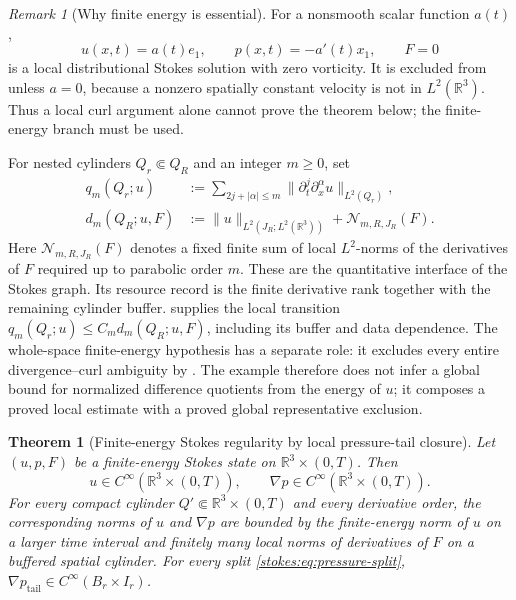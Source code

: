 \documentclass[11pt,reqno]{amsart}
\theoremstyle{plain}
\newtheorem{theorem}{Theorem}[section]
\theoremstyle{definition}
\theoremstyle{remark}
\newtheorem{remark}[remark]{Remark}
\numberwithin{equation}{section}
\newcommand{\R}{\mathbb R}
\begin{document}
\begin{remark}[Why finite energy is essential]\label{stokes:rem:counterexample}
For a nonsmooth scalar function \(a(t)\),
\[
 u(x,t)=a(t)e_1,\qquad p(x,t)=-a'(t)x_1,\qquad F=0
\]
is a local distributional Stokes solution with zero vorticity.  It is excluded
from  unless \(a=0\), because a nonzero spatially
constant velocity is not in \(L^2(\R^3)\).  Thus a local curl argument alone
cannot prove the theorem below; the finite-energy branch must be used.
\end{remark}

For nested cylinders \(Q_r\Subset Q_R\) and an integer \(m\ge0\), set
\begin{align}
 q_m(Q_r;u)
 &:=\sum_{2j+|\alpha|\le m}
 \|\partial_t^j\partial_x^\alpha u\|_{L^2(Q_r)},
 \label{stokes:eq:q-interface}\\
 d_m(Q_R;u,F)
 &:=\|u\|_{L^2(J_R;L^2(\R^3))}
   +\mathcal N_{m,R,J_R}(F).
 \label{stokes:eq:d-interface}
\end{align}
Here \(\mathcal N_{m,R,J_R}(F)\) denotes a fixed finite sum of local
\(L^2\)-norms of the derivatives of \(F\) required up to parabolic order \(m\).
These are the quantitative interface of the Stokes graph.  Its resource record
is the finite derivative rank together with the remaining cylinder buffer.
 supplies the local transition
\(q_m(Q_r;u)\le C_m d_m(Q_R;u,F)\), including its buffer and data dependence.
The whole-space finite-energy hypothesis has a separate role: it excludes every
entire divergence--curl ambiguity by
.  The example therefore does not infer a
global bound for normalized difference quotients from the energy of \(u\); it
composes a proved local estimate with a proved global representative exclusion.

\begin{theorem}[Finite-energy Stokes regularity by local pressure-tail closure]
\label{stokes:thm:main}
Let \((u,p,F)\) be a finite-energy Stokes state on
\(\R^3\times(0,T)\).  Then
\[
 u\in C^\infty(\R^3\times(0,T)),
 \qquad \nabla p\in C^\infty(\R^3\times(0,T)).
\]
For every compact cylinder \(Q'\Subset\R^3\times(0,T)\) and every derivative
order, the corresponding norms of \(u\) and \(\nabla p\) are bounded by the
finite-energy norm of \(u\) on a larger time interval and finitely many local
norms of derivatives of \(F\) on a buffered spatial cylinder.  For every split
\eqref{stokes:eq:pressure-split},
\(\nabla p_{\mathrm{tail}}\in C^\infty(B_r\times I_r)\).
\end{theorem}
\end{document}
